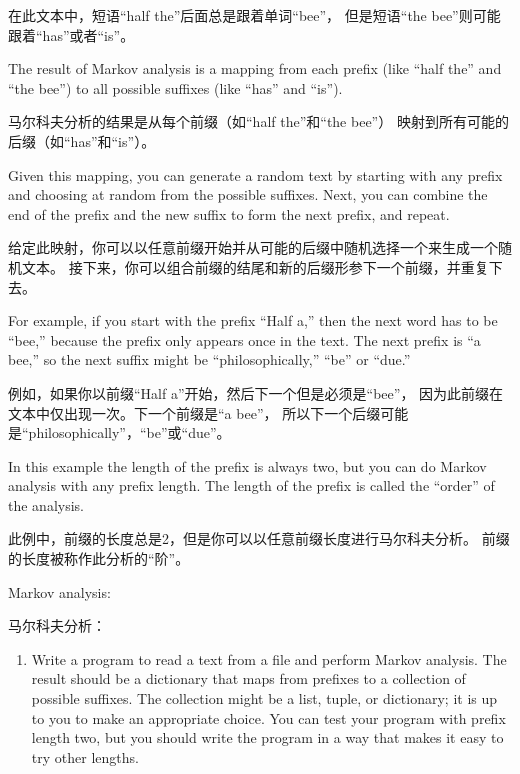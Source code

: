 \documentclass[10pt]{book}
\begin{document}
\begin{CJK}{UTF8}{gbsn}
在此文本中，短语``half the''后面总是跟着单词``bee''，
但是短语``the bee''则可能跟着``has''或者``is''。

The result of Markov analysis is a mapping from each prefix
(like ``half the'' and ``the bee'') to all possible suffixes
(like ``has'' and ``is'').

马尔科夫分析的结果是从每个前缀（如``half the''和``the bee''）
映射到所有可能的后缀（如``has''和``is''）。

Given this mapping, you can generate a random text by
starting with any prefix and choosing at random from the
possible suffixes.  Next, you can combine the end of the
prefix and the new suffix to form the next prefix, and repeat.

给定此映射，你可以以任意前缀开始并从可能的后缀中随机选择一个来生成一个随机文本。
接下来，你可以组合前缀的结尾和新的后缀形参下一个前缀，并重复下去。

For example, if you start with the prefix ``Half a,'' then the
next word has to be ``bee,'' because the prefix only appears
once in the text.  The next prefix is ``a bee,'' so the
next suffix might be ``philosophically,'' ``be'' or ``due.''

例如，如果你以前缀``Half a''开始，然后下一个但是必须是``bee''，
因为此前缀在文本中仅出现一次。下一个前缀是``a bee''，
所以下一个后缀可能是``philosophically''，``be''或``due''。

In this example the length of the prefix is always two, but
you can do Markov analysis with any prefix length.  The length
of the prefix is called the ``order'' of the analysis.

此例中，前缀的长度总是2，但是你可以以任意前缀长度进行马尔科夫分析。
前缀的长度被称作此分析的``阶''。

\begin{exercise}

Markov analysis:

马尔科夫分析：

\begin{enumerate}

\item Write a program to read a text from a file and perform Markov
analysis.  The result should be a dictionary that maps from
prefixes to a collection of possible suffixes.  The collection
might be a list, tuple, or dictionary; it is up to you to make
an appropriate choice.  You can test your program with prefix
length two, but you should write the program in a way that makes
it easy to try other lengths.


\end{enumerate}
\end{exercise}
\end{CJK}
\end{document}
